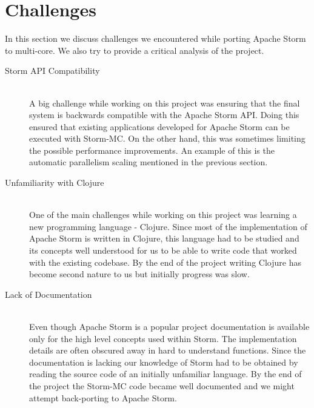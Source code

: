 \documentclass[bsc,twoside,singlespacing,normalheadings,parskip]{infthesis}\usepackage[]{graphicx}\usepackage[]{color}
\begin{document}
\section{Challenges}
\label{sec:challenges}

In this section we discuss challenges we encountered while porting Apache Storm to multi-core. We also try to provide a critical analysis of the project.

\begin{description}
	\item[Storm API Compatibility] \hfill \\
	A big challenge while working on this project was ensuring that the final system is backwards compatible with the Apache Storm API. Doing this ensured that existing applications developed for Apache Storm can be executed with Storm-MC. On the other hand, this was sometimes limiting the possible performance improvements. An example of this is the automatic parallelism scaling mentioned in the previous section.
	\item[Unfamiliarity with Clojure] \hfill \\
	One of the main challenges while working on this project was learning a new programming language - Clojure. Since most of the implementation of Apache Storm is written in Clojure, this language had to be studied and its concepts well understood for us to be able to write code that worked with the existing codebase. By the end of the project writing Clojure has become second nature to us but initially progress was slow.
	\item[Lack of Documentation] \hfill \\
	Even though Apache Storm is a popular project documentation is available only for the high level concepts used within Storm. The implementation details are often obscured away in hard to understand functions. Since the documentation is lacking our knowledge of Storm had to be obtained by reading the source code of an initially unfamiliar language. By the end of the project the Storm-MC code became well documented and we might attempt back-porting to Apache Storm.
\end{description}


\clearpage{}
\end{document}
